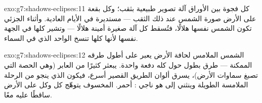 \begin{solution}{exo:g7:shadows-eclipses:11}
كل فجوة بين الأوراق آلة تصوير طبيعية بثقب؛ وكل بقعة على الأرض
صورة الشمس عند ذلك الثقب --- مستديرة في الأيام العادية. وأثناء
 الجزئي تكون الشمس نفسها هلالًا، فتُسقط كل آلة صغيرة
أمينة هلالًا --- وتشير كلها في الجهة نفسها لأنها كلها تنسخ
 الواحد الذي في السماء.
\end{solution}

\begin{solution}{exo:g7:shadows-eclipses:12}
 الشمس الملامس لحافة الأرض يعبر  على أطول طرقه
الممكنة --- طرق بطول  حول  كله دفعة واحدة. 
يبعثر كثيرًا من  العابر (وهي الحصة التي تصبغ سماوات
الأرض)،  يسرق ألوان الطريق القصير أسرع، فيكون 
الذي ينجو من الرحلة الملامسة الطويلة وينثني إلى  هو ناجي
: أحمر.  المخسوف يتوهّج  كل  وكل  على
الأرض ساقطًا عليه معًا.
\end{solution}

